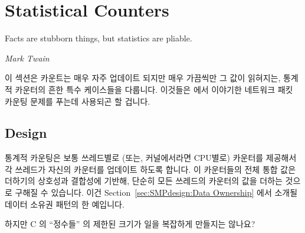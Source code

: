 \section{Statistical Counters}
\label{sec:count:Statistical Counters}
%
\epigraph{Facts are stubborn things, but statistics are pliable.}
	 {\emph{Mark Twain}}

이 섹션은 카운트는 매우 자주 업데이트 되지만 매우 가끔씩만 그 값이 읽혀지는,
통계적 카운터의 흔한 특수 케이스들을 다룹니다.
이것들은 \QuickQuizRef{\QcountQstatcnt} 에서 이야기한 네트워크 패킷 카운팅
문제를 푸는데 사용되곤 할 겁니다.

\subsection{Design}

통계적 카운팅은 보통 쓰레드별로 (또는, 커널에서라면 CPU별로) 카운터를 제공해서
각 쓰레드가 자신의 카운터를 업데이트 하도록 합니다.
이 카운터들의 전체 통합 값은 더하기의 상호성과 결합성에 기반해, 단순히 모든
쓰레드의 카운터의 값을 더하는 것으로 구해질 수 있습니다.
이건 Section~\ref{sec:SMPdesign:Data Ownership} 에서 소개될 데이터 소유권
패턴의 한 예입니다.

\QuickQuiz{}
	하지만 C 의 ``정수들'' 의 제한된 크기가 일을 복잡하게 만들지는 않나요?
	\iffalse


